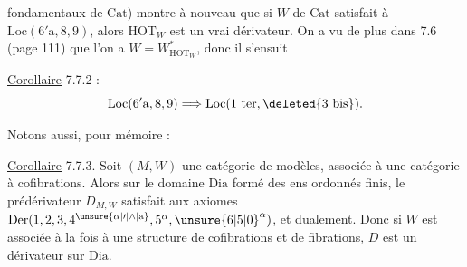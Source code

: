 fondamentaux de $\mathrm{Cat}$) montre à
nouveau que si $W$  de $\mathrm{Cat}$ satisfait
à $\mathrm{Loc}(6'\mathrm{a},8,9)$, alors $\mathrm{HOT}_{W}$ est
un vrai dérivateur. On a vu de
plus dans 7.6 (page 111) que l'on
a  $W=W^{\ast}_{\mathrm{HOT}_{W}}$, donc il s'ensuit

\uline{Corollaire} 7.7.2 :  
\[
\mathrm{Loc}(6'\mathrm{a},8,9)\Longrightarrow\mathrm{Loc}(1\ \mathrm{ter},\deleted{3\ \mathrm{bis}}).
\]

Notons aussi, pour mémoire :

\uline{Corollaire} 7.7.3. Soit $(M,W)$ une
catégorie de modèles, associée à
une catégorie à cofibrations. Alors
sur le domaine $\mathrm{Dia}$ formé des
ens ordonnés finis, le prédérivateur
$D_{M,W}$ satisfait aux axiomes
$\mathrm{Der}(1,2,3,4^{\unsure{\alpha|\prime|\wedge|\mathrm{a}}},5^{\alpha},\unsure{6|5|0}^{\alpha})$, et dualement. Donc
si $W$ est associée à la fois à une
structure de cofibrations et de fibrations,
$D$ est un dérivateur sur $\mathrm{Dia}$.
